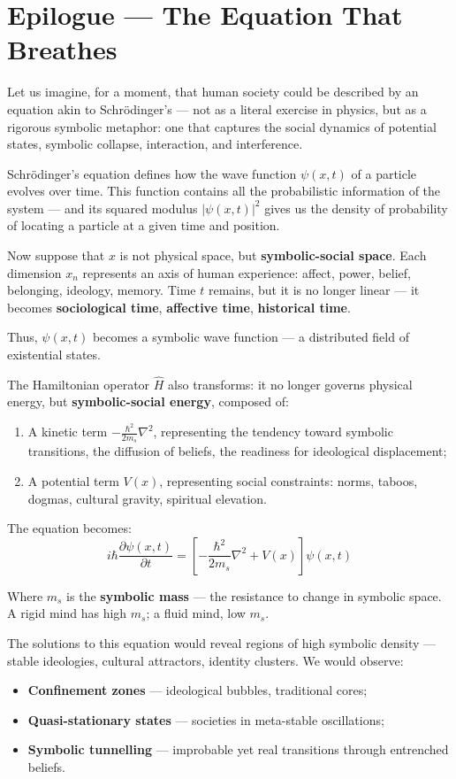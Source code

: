\section*{Epilogue — The Equation That Breathes}

Let us imagine, for a moment, that human society could be described by an equation akin to Schrödinger’s — not as a literal exercise in physics, but as a rigorous symbolic metaphor: one that captures the social dynamics of potential states, symbolic collapse, interaction, and interference.

Schrödinger’s equation defines how the wave function \( \psi(x,t) \) of a particle evolves over time. This function contains all the probabilistic information of the system — and its squared modulus \( |\psi(x,t)|^2 \) gives us the density of probability of locating a particle at a given time and position.

Now suppose that \( x \) is not physical space, but \textbf{symbolic-social space}. Each dimension \( x_n \) represents an axis of human experience: affect, power, belief, belonging, ideology, memory. Time \( t \) remains, but it is no longer linear — it becomes \textbf{sociological time}, \textbf{affective time}, \textbf{historical time}.

Thus, \( \psi(x,t) \) becomes a symbolic wave function — a distributed field of existential states.

The Hamiltonian operator \( \hat{H} \) also transforms: it no longer governs physical energy, but \textbf{symbolic-social energy}, composed of:
\begin{enumerate}
  \item A kinetic term \( -\frac{\hbar^2}{2m_s}\nabla^2 \), representing the tendency toward symbolic transitions, the diffusion of beliefs, the readiness for ideological displacement;
  \item A potential term \( V(x) \), representing social constraints: norms, taboos, dogmas, cultural gravity, spiritual elevation.
\end{enumerate}

The equation becomes:
\[
i\hbar \frac{\partial \psi(x,t)}{\partial t} = \left[ -\frac{\hbar^2}{2m_s} \nabla^2 + V(x) \right] \psi(x,t)
\]

Where \( m_s \) is the \textbf{symbolic mass} — the resistance to change in symbolic space. A rigid mind has high \( m_s \); a fluid mind, low \( m_s \).

The solutions to this equation would reveal regions of high symbolic density — stable ideologies, cultural attractors, identity clusters. We would observe:
\begin{itemize}
  \item \textbf{Confinement zones} — ideological bubbles, traditional cores;
  \item \textbf{Quasi-stationary states} — societies in meta-stable oscillations;
  \item \textbf{Symbolic tunnelling} — improbable yet real transitions through entrenched beliefs.
\end{itemize}

